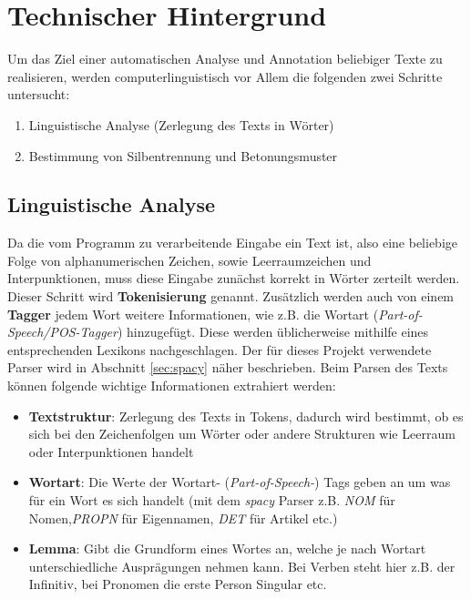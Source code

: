 \section{Technischer Hintergrund}

Um das Ziel einer automatischen Analyse und Annotation beliebiger Texte zu realisieren, werden computerlinguistisch vor Allem die folgenden zwei Schritte untersucht:
\begin{enumerate}
	\item Linguistische Analyse (Zerlegung des Texts in Wörter)
	\item Bestimmung von Silbentrennung und Betonungsmuster
\end{enumerate}

\subsection{Linguistische Analyse}
Da die vom Programm zu verarbeitende Eingabe ein Text ist, also eine beliebige Folge von alphanumerischen Zeichen, sowie Leerraumzeichen und Interpunktionen, muss diese Eingabe zunächst korrekt in Wörter zerteilt werden. Dieser Schritt wird \textbf{Tokenisierung} genannt. Zusätzlich werden auch von einem \textbf{Tagger} jedem Wort weitere Informationen, wie z.B. die Wortart (\textit{Part-of-Speech/POS-Tagger}) hinzugefügt. Diese werden üblicherweise mithilfe eines entsprechenden Lexikons nachgeschlagen. \cite{Carstensen2009} Der für dieses Projekt verwendete Parser wird in Abschnitt \ref{sec:spacy} näher beschrieben. Beim Parsen des Texts können folgende wichtige Informationen extrahiert werden:

\begin{itemize}
	\item \textbf{Textstruktur}: Zerlegung des Texts in Tokens, dadurch wird bestimmt, ob es sich bei den Zeichenfolgen um Wörter oder andere Strukturen wie Leerraum oder Interpunktionen handelt
	
	\item \textbf{Wortart}: Die Werte der Wortart- (\textit{Part-of-Speech-}) Tags geben an um was für ein Wort es sich handelt (mit dem \textit{spacy} Parser z.B. \textit{NOM} für Nomen,\textit{PROPN} für Eigennamen, \textit{DET} für Artikel etc.)
	
	\item  \textbf{Lemma}: Gibt die Grundform eines Wortes an, welche je nach Wortart unterschiedliche Ausprägungen nehmen kann. Bei Verben steht hier z.B. der Infinitiv, bei Pronomen die erste Person Singular etc. 
\end{itemize}

